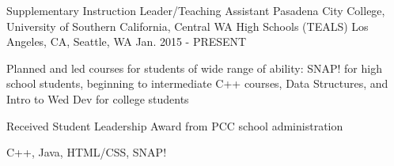 \begin{cventries}
  \cventry
    {Supplementary Instruction Leader/Teaching Assistant} %
    {Pasadena City College, University of Southern California, Central WA High Schools (TEALS)} %
    {Los Angeles, CA, Seattle, WA} %
    {Jan. 2015 - PRESENT} %
    {
      \begin{cvitems} %
        \item {Planned and led courses for students of wide range of ability: SNAP! for high school students, beginning to intermediate C++ courses, Data Structures, and Intro to Wed Dev for college students}
        \item {Received Student Leadership Award from PCC school administration}
        \item {C++, Java, HTML/CSS, SNAP!}
      \end{cvitems}
    }
\end{cventries}
